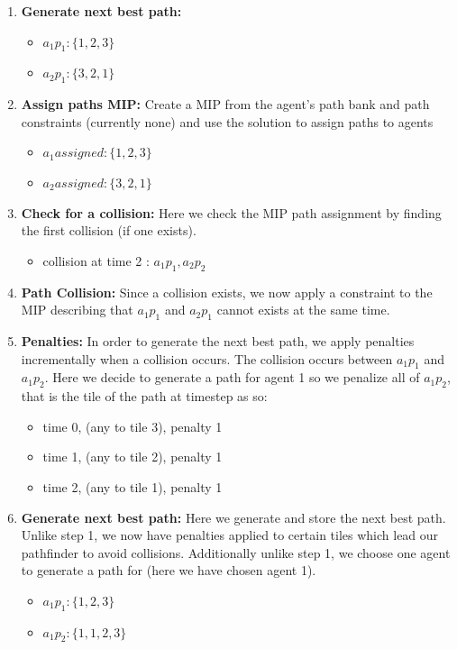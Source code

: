\documentclass[a4paper,11pt]{article}
\begin{document}
\begin{enumerate}
	\item \textbf{Generate next best path:}
	\begin{itemize}
		\item $a_1p_1: \{1, 2, 3\}$
		\item $a_2p_1: \{3, 2, 1\}$
	\end{itemize}
	\item \textbf{Assign paths MIP:} Create a MIP from the agent's path bank and path constraints (currently none) and use the solution to assign paths to agents
	\begin{itemize}
		\item $a_1assigned: \{1, 2, 3\}$
		\item $a_2assigned: \{3, 2, 1\}$
	\end{itemize}
	\item \textbf{Check for a collision:} Here we check the MIP path assignment by finding the first collision (if one exists). 
	\begin{itemize}
		\item collision at time 2 : $a_1p_1, a_2p_2$
	\end{itemize}
	\item \textbf{Path Collision:} Since a collision exists, we now apply a constraint to the MIP describing that $a_1p_1$ and $a_2p_1$ cannot exists at the same time.
	\item \textbf{Penalties:} In order to generate the next best path, we apply penalties incrementally when a collision occurs. The collision occurs between $a_1p_1$ and $a_1p_2$. Here we decide to generate a path for agent 1 so we penalize all of $a_1p_2$, that is the tile of the path at timestep as so:
	\begin{itemize}
		\item time 0, (any to tile 3), penalty 1
		\item time 1, (any to tile 2), penalty 1
		\item time 2, (any to tile 1), penalty 1
	\end{itemize}
	\item \textbf{Generate next best path:} Here we generate and store the next best path. Unlike step 1, we now have penalties applied to certain tiles which lead our pathfinder to avoid collisions. Additionally unlike step 1, we choose one agent to generate a path for (here we have chosen agent 1).
	\begin{itemize}
		\item $a_1p_1: \{1, 2, 3\}$
		\item $a_1p_2: \{1, 1, 2, 3\}$

\end{itemize}
\end{enumerate}
\end{document}
